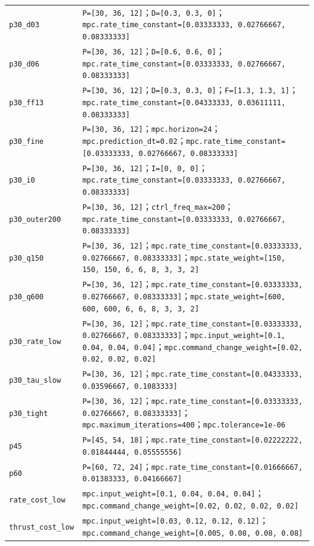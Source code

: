 \documentclass[UTF8,a4paper,11pt,fontset=fandol]{ctexart}
\newcommand{\code}[1]{{\small\nolinkurl{#1}}}
\begin{document}
{\begin{longtable}{L{3.3cm}L{11.9cm}}
\code{p30_d03} & \code{P=[30, 36, 12]}；\code{D=[0.3, 0.3, 0]}；\code{mpc.rate_time_constant=[0.03333333, 0.02766667, 0.08333333]}\\
\code{p30_d06} & \code{P=[30, 36, 12]}；\code{D=[0.6, 0.6, 0]}；\code{mpc.rate_time_constant=[0.03333333, 0.02766667, 0.08333333]}\\
\code{p30_ff13} & \code{P=[30, 36, 12]}；\code{D=[0.3, 0.3, 0]}；\code{F=[1.3, 1.3, 1]}；\code{mpc.rate_time_constant=[0.04333333, 0.03611111, 0.08333333]}\\
\code{p30_fine} & \code{P=[30, 36, 12]}；\code{mpc.horizon=24}；\code{mpc.prediction_dt=0.02}；\code{mpc.rate_time_constant=[0.03333333, 0.02766667, 0.08333333]}\\
\code{p30_i0} & \code{P=[30, 36, 12]}；\code{I=[0, 0, 0]}；\code{mpc.rate_time_constant=[0.03333333, 0.02766667, 0.08333333]}\\
\code{p30_outer200} & \code{P=[30, 36, 12]}；\code{ctrl_freq_max=200}；\code{mpc.rate_time_constant=[0.03333333, 0.02766667, 0.08333333]}\\
\code{p30_q150} & \code{P=[30, 36, 12]}；\code{mpc.rate_time_constant=[0.03333333, 0.02766667, 0.08333333]}；\code{mpc.state_weight=[150, 150, 150, 6, 6, 8, 3, 3, 2]}\\
\code{p30_q600} & \code{P=[30, 36, 12]}；\code{mpc.rate_time_constant=[0.03333333, 0.02766667, 0.08333333]}；\code{mpc.state_weight=[600, 600, 600, 6, 6, 8, 3, 3, 2]}\\
\code{p30_rate_low} & \code{P=[30, 36, 12]}；\code{mpc.rate_time_constant=[0.03333333, 0.02766667, 0.08333333]}；\code{mpc.input_weight=[0.1, 0.04, 0.04, 0.04]}；\code{mpc.command_change_weight=[0.02, 0.02, 0.02, 0.02]}\\
\code{p30_tau_slow} & \code{P=[30, 36, 12]}；\code{mpc.rate_time_constant=[0.04333333, 0.03596667, 0.1083333]}\\
\code{p30_tight} & \code{P=[30, 36, 12]}；\code{mpc.rate_time_constant=[0.03333333, 0.02766667, 0.08333333]}；\code{mpc.maximum_iterations=400}；\code{mpc.tolerance=1e-06}\\
\code{p45} & \code{P=[45, 54, 18]}；\code{mpc.rate_time_constant=[0.02222222, 0.01844444, 0.05555556]}\\
\code{p60} & \code{P=[60, 72, 24]}；\code{mpc.rate_time_constant=[0.01666667, 0.01383333, 0.04166667]}\\
\code{rate_cost_low} & \code{mpc.input_weight=[0.1, 0.04, 0.04, 0.04]}；\code{mpc.command_change_weight=[0.02, 0.02, 0.02, 0.02]}\\
\code{thrust_cost_low} & \code{mpc.input_weight=[0.03, 0.12, 0.12, 0.12]}；\code{mpc.command_change_weight=[0.005, 0.08, 0.08, 0.08]}\\
\bottomrule\end{longtable}}
\end{document}
